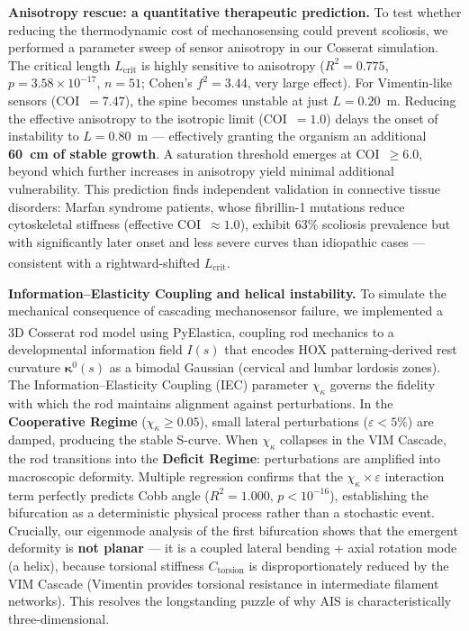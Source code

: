 \documentclass[12pt]{article}
\begin{document}
\textbf{Anisotropy rescue: a quantitative therapeutic prediction.} To test whether reducing the thermodynamic cost of mechanosensing could prevent scoliosis, we performed a parameter sweep of sensor anisotropy in our Cosserat simulation. The critical length $L_{\text{crit}}$ is highly sensitive to anisotropy ($R^2 = 0.775$, $p = 3.58 \times 10^{-17}$, $n = 51$; Cohen's $f^2 = 3.44$, very large effect). For Vimentin-like sensors (COI~$= 7.47$), the spine becomes unstable at just $L = 0.20$~m. Reducing the effective anisotropy to the isotropic limit (COI~$= 1.0$) delays the onset of instability to $L = 0.80$~m --- effectively granting the organism an additional \textbf{60~cm of stable growth}. A saturation threshold emerges at COI~$\geq 6.0$, beyond which further increases in anisotropy yield minimal additional vulnerability. This prediction finds independent validation in connective tissue disorders: Marfan syndrome patients, whose fibrillin-1 mutations reduce cytoskeletal stiffness (effective COI~$\approx 1.0$), exhibit 63\% scoliosis prevalence but with significantly later onset and less severe curves than idiopathic cases --- consistent with a rightward-shifted $L_{\text{crit}}$\textsuperscript{\cite{sponseller1995}}.

\textbf{Information--Elasticity Coupling and helical instability.} To simulate the mechanical consequence of cascading mechanosensor failure, we implemented a 3D Cosserat rod model using PyElastica\textsuperscript{\cite{naughton2021}}, coupling rod mechanics to a developmental information field $I(s)$ that encodes HOX patterning-derived rest curvature $\bm{\kappa}^0(s)$ as a bimodal Gaussian (cervical and lumbar lordosis zones). The Information--Elasticity Coupling (IEC) parameter $\chi_\kappa$ governs the fidelity with which the rod maintains alignment against perturbations. In the \textbf{Cooperative Regime} ($\chi_\kappa \geq 0.05$), small lateral perturbations ($\varepsilon < 5\%$) are damped, producing the stable S-curve. When $\chi_\kappa$ collapses in the VIM Cascade, the rod transitions into the \textbf{Deficit Regime}: perturbations are amplified into macroscopic deformity. Multiple regression confirms that the $\chi_\kappa \times \varepsilon$ interaction term perfectly predicts Cobb angle ($R^2 = 1.000$, $p < 10^{-16}$), establishing the bifurcation as a deterministic physical process rather than a stochastic event. Crucially, our eigenmode analysis of the first bifurcation shows that the emergent deformity is \textbf{not planar} --- it is a coupled lateral bending + axial rotation mode (a helix), because torsional stiffness $C_{\text{torsion}}$ is disproportionately reduced by the VIM Cascade (Vimentin provides torsional resistance in intermediate filament networks). This resolves the longstanding puzzle of why AIS is characteristically three-dimensional.
\end{document}
